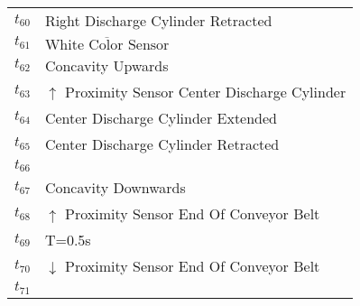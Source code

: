 \begin{longtable}{M{5cm}M{10cm}}
\hyperlink{partialNet:t60}{\hypertarget{partialTable:t60}{$t_{60}$}} & Right Discharge Cylinder Retracted\\
\hyperlink{partialNet:t61}{\hypertarget{partialTable:t61}{$t_{61}$}} & \(\overline{\mbox{White Color Sensor}}\)\\
\hyperlink{partialNet:t62}{\hypertarget{partialTable:t62}{$t_{62}$}} & Concavity Upwards\\
\hyperlink{partialNet:t63}{\hypertarget{partialTable:t63}{$t_{63}$}} & \(\uparrow\) Proximity Sensor Center Discharge Cylinder\\
\hyperlink{partialNet:t64}{\hypertarget{partialTable:t64}{$t_{64}$}} & Center Discharge Cylinder Extended\\
\hyperlink{partialNet:t65}{\hypertarget{partialTable:t65}{$t_{65}$}} & Center Discharge Cylinder Retracted\\
\hyperlink{partialNet:t66}{\hypertarget{partialTable:t66}{$t_{66}$}} & \\
\hyperlink{partialNet:t67}{\hypertarget{partialTable:t67}{$t_{67}$}} & Concavity Downwards\\
\hyperlink{partialNet:t68}{\hypertarget{partialTable:t68}{$t_{68}$}} & \(\uparrow\) Proximity Sensor End Of Conveyor Belt\\
\hyperlink{partialNet:tt69}{\hypertarget{partialTable:tt69}{$t_{69}$}} & T=0.5s\\
\hyperlink{partialNet:t70}{\hypertarget{partialTable:t70}{$t_{70}$}} & \(\downarrow\) Proximity Sensor End Of Conveyor Belt\\
\hyperlink{partialNet:t71}{\hypertarget{partialTable:t71}{$t_{71}$}} & \\
\end{longtable}
